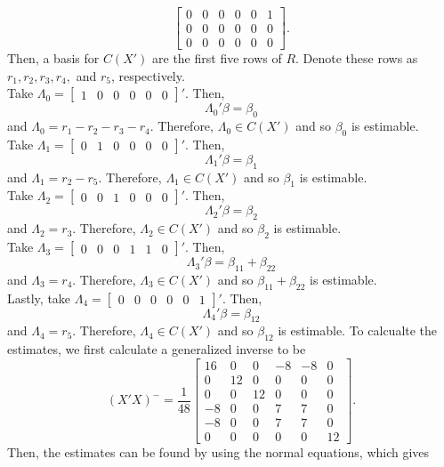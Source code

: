 \documentclass[11pt]{article}
\begin{document}
\begin{itemize}
\[\begin{bmatrix}
0 & 0 & 0 & 0 & 0 & 1 \\
0 & 0 & 0 & 0 & 0 & 0 \\
0 & 0 & 0 & 0 & 0 & 0 
\end{bmatrix}.
\]
Then, a basis for $C(X')$ are the first five rows of $R$.  Denote these rows as $r_1,r_2,r_3,r_4,$ and $r_5$, respectively.\\
Take $\Lambda_0 = \begin{bmatrix}
1 & 0 & 0 & 0 & 0 & 0
\end{bmatrix}'$.  Then,
\[
\Lambda_0'\beta = \beta_0
\]
and $\Lambda_0 = r_1 - r_2 - r_3 - r_4$.  Therefore, $\Lambda_0 \in C(X')$ and so $\beta_0$ is estimable.\\
Take $\Lambda_1 = \begin{bmatrix}
0 & 1 & 0 & 0 & 0 & 0
\end{bmatrix}'$.  Then,
\[
\Lambda_1'\beta = \beta_1
\]
and $\Lambda_1 = r_2 - r_5.$  Therefore, $\Lambda_1\in C(X')$ and so $\beta_1$ is estimable.\\
Take $\Lambda_2 = \begin{bmatrix}
0 & 0 & 1 & 0 & 0 & 0
\end{bmatrix}'$.  Then,
\[
\Lambda_2'\beta = \beta_2
\]
and $\Lambda_2 = r_3$.  Therefore, $\Lambda_2\in C(X')$ and so $\beta_2$ is estimable. \\
Take $\Lambda_{3} = \begin{bmatrix}
0 & 0 & 0 & 1 & 1 & 0
\end{bmatrix}'$.  Then,
\[
\Lambda_3'\beta = \beta_{11} + \beta_{22}
\]
and $\Lambda_3 = r_4$.  Therefore, $\Lambda_3\in C(X')$ and so $\beta_{11} + \beta_{22}$ is estimable. \\
Lastly, take $\Lambda_4 = \begin{bmatrix}
0 &0 &0 &0 &0 &1
\end{bmatrix}'$.  Then,
\[
\Lambda_4'\beta = \beta_{12}
\]
and $\Lambda_4 = r_5$.  Therefore, $\Lambda_4\in C(X')$ and so $\beta_{12}$ is estimable.  To calcualte the estimates, we first calculate a generalized inverse to be
\[
(X'X)^- = \frac{1}{48}\begin{bmatrix}
16 & 0 & 0 & -8 & -8 & 0 \\
0 & 12 & 0 & 0 & 0 & 0 \\
0 & 0 & 12 & 0 & 0 & 0 \\
-8 & 0 & 0 & 7 & 7 & 0 \\
-8 & 0 & 0 & 7 & 7 & 0 \\
0 & 0 & 0 & 0 & 0 & 12
\end{bmatrix}.
\]
Then, the estimates can be found by using the normal equations, which gives

\end{itemize}
\end{document}

